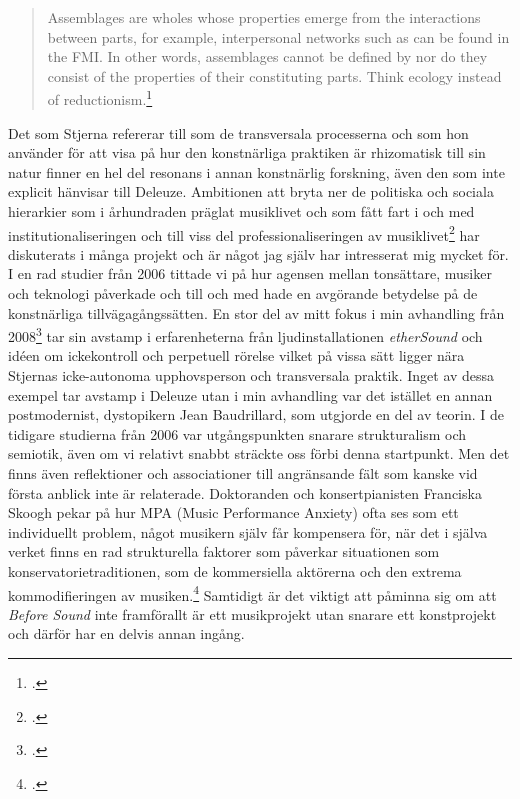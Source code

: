 \documentclass[11pt]{article}
\let\footnote=\endnote
\begin{document}
\begin{quote}
    Assemblages are wholes whose properties emerge from the
    interactions between parts, for example, interpersonal networks
    such as can be found in the FMI. In other words, assemblages
    cannot be defined by nor do they consist of the properties of
    their constituting parts. Think ecology instead of
    reductionism.\footcite{frisk-cobussen09}
\end{quote}

Det som Stjerna refererar till som de transversala processerna och som
hon använder för att visa på hur den konstnärliga praktiken är
rhizomatisk till sin natur finner en hel del resonans i annan
konstnärlig forskning, även den som inte explicit hänvisar till
Deleuze. Ambitionen att bryta ner de politiska och sociala hierarkier
som i århundraden präglat musiklivet och som fått fart i och med
institutionaliseringen och till viss del professionaliseringen av
musiklivet\footcite{frisk2016b} har diskuterats i många projekt och är
något jag själv har intresserat mig mycket för. I en rad studier från
2006 tittade vi på hur agensen mellan tonsättare, musiker och
teknologi påverkade och till och med hade en avgörande betydelse på de
konstnärliga tillvägagångssätten.\footnote{Se bland annat
    \fullcite{frisk-ost06} och \fullcite{frisk-ost06-2}.} En stor del
av mitt fokus i min avhandling från 2008\footcite{frisk08phd} tar sin
avstamp i erfarenheterna från ljudinstallationen \emph{etherSound} och
idéen om ickekontroll och perpetuell rörelse vilket på vissa sätt
ligger nära Stjernas icke-autonoma upphovsperson och transversala
praktik. Inget av dessa exempel tar avstamp i Deleuze utan i min
avhandling var det istället en annan postmodernist, dystopikern Jean
Baudrillard, som utgjorde en del av teorin. I de tidigare studierna
från 2006 var utgångspunkten snarare strukturalism och semiotik, även
om vi relativt snabbt sträckte oss förbi denna startpunkt. Men det
finns även reflektioner och associationer till angränsande fält som
kanske vid första anblick inte är relaterade. Doktoranden och
konsertpianisten Franciska Skoogh pekar på hur MPA (Music Performance
Anxiety) ofta ses som ett individuellt problem, något musikern själv
får kompensera för, när det i själva verket finns en rad strukturella
faktorer som påverkar situationen som konservatorietraditionen, som de
kommersiella aktörerna och den extrema kommodifieringen av
musiken.\footcite{frisk2019} Samtidigt är det viktigt att påminna sig
om att \emph{Before Sound} inte framförallt är ett musikprojekt utan
snarare ett konstprojekt och därför har en delvis annan ingång.
\end{document}
